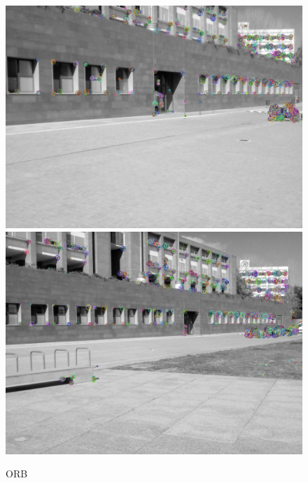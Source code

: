 		\begin{figure}[!htb]
				\includegraphics[width=\linewidth]{images/experiments/KP_ORB_2}
				\label{fig:awesome_image1}
			\endminipage\hfill
				\includegraphics[width=\linewidth]{images/experiments/KP_ORB_3}
				\label{fig:awesome_image2}
			\endminipage
			\caption{ORB}
		\end{figure}

\newpage

